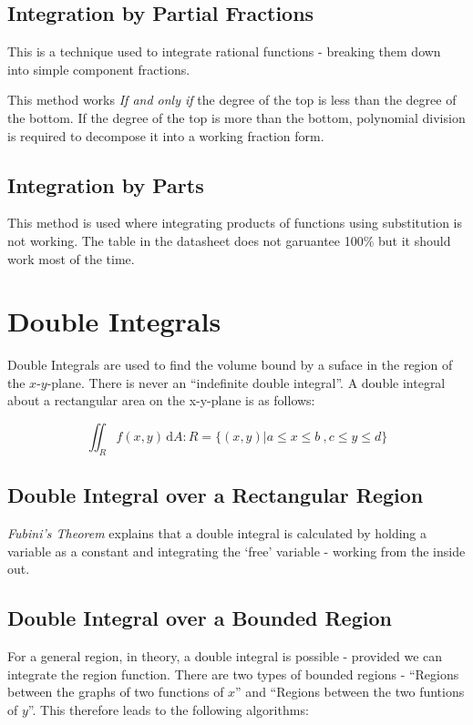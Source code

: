 \documentclass[a4paper, 11pt]{article}
\begin{document}
\subsection{Integration by Partial Fractions}
This is a technique used to integrate rational functions - breaking them down into simple component fractions. 

This method works \emph{If and only if} the degree of the top is less than the degree of the bottom. If the degree of the top is more than the bottom, polynomial division is required to decompose it into a working fraction form.

\subsection{Integration by Parts}
This method is used where integrating products of functions using substitution is not working. The table in the datasheet does not garuantee 100\% but it should work most of the time.

\section{Double Integrals}
Double Integrals are used to find the volume bound by a suface in the region of the $x$-$y$-plane. There is never an ``indefinite double integral''. A double integral about a rectangular area on the x-y-plane is as follows: 

\[
    \iint_R f(x,y) \, \mathrm{d}A : R = \{(x,y) | a \leq x \leq b \ , c \leq y \leq d \}   
\]

\subsection{Double Integral over a Rectangular Region}

\emph{Fubini's Theorem} explains that a double integral is calculated by holding a variable as a constant and integrating the `free' variable - working from the inside out.

\subsection{Double Integral over a Bounded Region}
For a general region, in theory, a double integral is possible - provided we can integrate the region function. There are two types of bounded regions - ``Regions between the graphs of two functions of $x$'' and ``Regions between the two funtions of $y$''. This therefore leads to the following algorithms:
\end{document}
